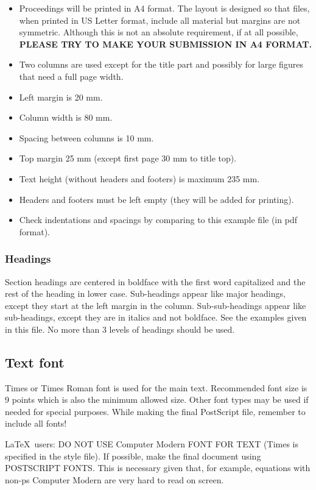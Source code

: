 \begin{itemize}
\item Proceedings will be printed in A4 format. The layout is designed 
so that files, when printed in US Letter format, include all material 
but margins are not symmetric. 
Although this is not an absolute requirement, if at all possible,
{\bf PLEASE TRY TO MAKE YOUR SUBMISSION IN A4 FORMAT.}
\item Two columns are used except for the title part and possibly for large 
figures that need a full page width.
\item Left margin is 20 mm.
\item Column width is 80 mm.
\item Spacing between columns is 10 mm.
\item Top margin 25 mm (except first page 30 mm to title top).
\item Text height (without headers and footers) is maximum 235 mm.
\item Headers and footers must be left empty (they will be added for 
printing).
\item Check indentations and spacings by comparing to this 
example file (in pdf format).
\end{itemize}

\subsubsection{Headings}

Section headings are centered in boldface
with the first word capitalized and the rest of the heading in 
lower case. Sub-headings appear like major headings, except they 
start at the left margin in the column.
Sub-sub-headings appear like sub-headings, except they are in italics 
and not boldface. See the examples given in this 
file. No more than 3 levels of headings should be used.

\subsection{Text font}

Times or Times Roman font is used for the main text. Recommended 
font size is 9 points which is also the minimum allowed size.
Other font types may be used if needed for 
special purposes. While making the final PostScript file, 
remember to include all fonts!

\LaTeX\ users: DO NOT USE Computer Modern FONT FOR TEXT (Times is 
specified in the style file). If possible, make the final 
document using POSTSCRIPT FONTS.
This is necessary given that, for example, equations with 
non-ps Computer Modern are very hard to read on screen.


